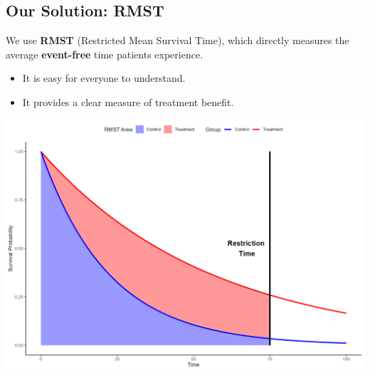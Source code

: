 \documentclass[a0,landscape]{a0poster}
\begin{document}
\begin{minipage}[t]{0.48\linewidth}
    \subsection*{\Large Our Solution: RMST}
    \large We use \textbf{RMST} (Restricted Mean Survival Time), which directly measures the average \textbf{event-free} time patients experience.
    \begin{itemize}
        \item[\large\checkmark] It is easy for everyone to understand.
        \item[\large\checkmark] It provides a clear measure of treatment benefit.
    \end{itemize}
    \begin{center}
        \includegraphics[width=\linewidth]{images/rmst_causal_plot.png}
    \end{center}
\end{minipage}
\hfill
\end{document}
